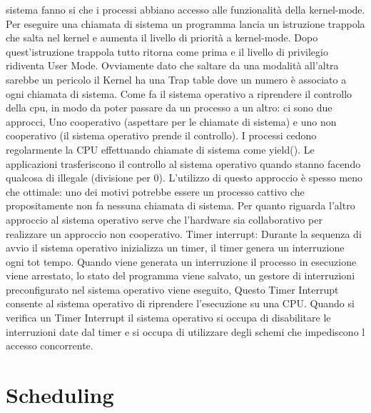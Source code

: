 \documentclass{article}
\begin{document}
sistema fanno si che i processi abbiano accesso alle funzionalità della kernel-mode. Per eseguire una chiamata di sistema un programma lancia un istruzione trappola che salta nel kernel e aumenta il livello di priorità a kernel-mode. Dopo quest’istruzione trappola tutto ritorna come prima e il livello di privilegio ridiventa User Mode. Ovviamente dato che saltare da una modalità all’altra sarebbe un pericolo il Kernel ha una Trap table dove un numero è associato a ogni chiamata di sistema. Come fa il sistema operativo a riprendere il controllo della cpu, in modo da poter passare da un processo a un altro: ci sono due approcci, Uno cooperativo (aspettare per le chiamate di sistema) e uno non cooperativo (il sistema operativo prende il controllo). I processi cedono regolarmente la CPU effettuando chiamate di sistema come yield(). Le applicazioni trasferiscono il controllo al sistema operativo quando stanno facendo qualcosa di illegale (divisione per 0). L’utilizzo di questo approccio è spesso meno che ottimale: uno dei motivi potrebbe essere un processo cattivo che propositamente non fa nessuna chiamata di sistema. Per quanto riguarda l’altro approccio al sistema operativo serve che l’hardware sia collaborativo per realizzare un approccio non cooperativo. Timer interrupt: Durante la sequenza di avvio il sistema operativo inizializza un timer, il timer genera un interruzione ogni tot tempo. Quando viene generata un interruzione il processo in esecuzione viene arrestato, lo stato del programma viene salvato, un gestore di interruzioni preconfigurato nel sistema operativo viene eseguito, Questo Timer Interrupt consente al sistema operativo di riprendere l’esecuzione su una CPU. Quando si verifica un Timer Interrupt il sistema operativo si occupa di disabilitare le interruzioni date dal timer e si occupa di utilizzare degli schemi che impediscono l accesso concorrente.
\section{Scheduling}
\end{document}
